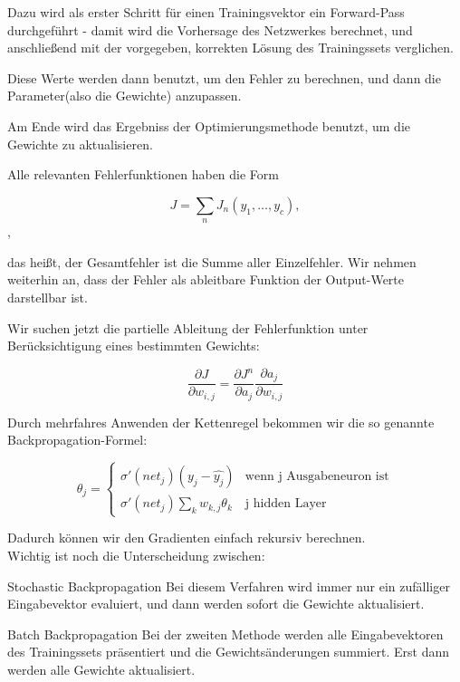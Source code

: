 Dazu wird als erster Schritt für einen Trainingsvektor ein Forward-Pass durchgeführt - damit wird die Vorhersage des Netzwerkes berechnet, und anschließend mit der vorgegeben, korrekten Lösung des Trainingssets verglichen.

Diese Werte werden dann benutzt, um den Fehler zu berechnen, und dann die Parameter(also die Gewichte) anzupassen.


Am Ende wird das Ergebniss der Optimierungsmethode benutzt, um die Gewichte zu aktualisieren. \cite{rumelhart1988learning}

Alle relevanten Fehlerfunktionen haben die Form 

\begin{equation}
J = \sum_n J_n(y_1, \ldots, y_c),
\end{equation},

das heißt, der Gesamtfehler ist die Summe aller Einzelfehler.
Wir nehmen weiterhin an, dass der Fehler als ableitbare Funktion der Output-Werte darstellbar ist.

Wir suchen jetzt die partielle Ableitung der Fehlerfunktion unter Berücksichtigung eines bestimmten Gewichts:

\begin{equation}
\frac{\partial J}{\partial w_{i,j}} = \frac{\partial J^n}{\partial a_j}  \frac{\partial a_j }{\partial w_{i,j}}
\end{equation}

Durch mehrfahres Anwenden der Kettenregel bekommen wir die so genannte Backpropagation-Formel:

\begin{equation}
\theta_j =  \begin{cases}
               \sigma ' (net_j) (y_j - \hat{y_j})           & \text{wenn j Ausgabeneuron ist}\\
               \sigma ' (net_j) \sum_k w_{k,j} \theta_k     & \text{j hidden Layer}
           \end{cases} 
\end{equation} 

Dadurch können wir den Gradienten einfach rekursiv berechnen. \cite{bishop1995neural} \\

Wichtig ist noch die Unterscheidung zwischen:

\begin{LaTeXdescription}
	\item[Stochastic Backpropagation]
	Bei diesem Verfahren wird immer nur ein zufälliger Eingabevektor evaluiert, und dann werden sofort die Gewichte aktualisiert. 
	\item[Batch Backpropagation] 
	Bei der zweiten Methode werden alle Eingabevektoren des Trainingssets präsentiert und die Gewichtsänderungen summiert. Erst dann werden alle Gewichte aktualisiert. 
\end{LaTeXdescription}\cite{duda2012pattern}

